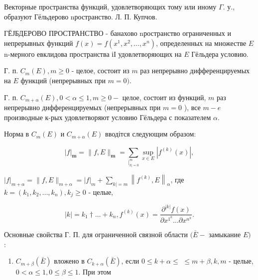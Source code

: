 \documentclass[10pt]{article}
\begin{document}
Векторные пространства функций, удовлетворяющих тому или иному $\Gamma$. у., образуют Гёльдерово nространство. Л. П. Купчов.



ГЁЈБДЕРОВО ПРОСТРАНСТВО - банахово nространство ограниченных и непрерывных функций $f(x)=f\left(x^{1}, x^{2}, \ldots, x^{n}\right)$, определенных на множестве $E$ n-мерного евклидова пространства іІ удовлетворяющих на $E$ Гёльдера условию.



Г. п. $C_{m}(E), m \geqslant 0$ - целое, состоит из $m$ раз непрерывно дифференцируемых на $E$ функций (непрерывных при $m=0)$.



Г. п. $C_{m+\alpha}(E), 0<\alpha \leqslant 1, m \geqslant 0-$ целое, состоит из функций, $m$ раз непрерывно дифференцируемых (непрерывных при $m=0$ ), все $m-e$ производные к-рых удовлетворяют условию Гёльдера с показателем $\alpha$.



Норма в $C_{m}(E)$ и $C_{m+\alpha}(E)$ вводітся следующим образом:



\[

|f|_{\boldsymbol{m}}=\|f, E\|_{\boldsymbol{m}}=\sum_{\left.\right|_{k \mid=0} ^{m}} \sup _{x \in E}\left|f^{(k)}(x)\right|,

\]



$|f|_{m+\alpha}=\|f, E\|_{m+\alpha}=|f|_{m}+\sum_{k \mid=m}\left\|f^{(k)}, E\right\|_{\alpha}$, где $k=\left(k_{1}, k_{2}, \ldots, k_{n}\right), k_{j} \geqslant 0$ - целые,



\[

|k|=k_{1} \dagger \ldots+k_{n}, f^{(k)}(x)=\frac{\partial^{|k|} f(x)}{\partial x^{1^{k}} \ldots \partial x^{n^{k}}} .

\]



Основные свойства Г. П. для ограниченной связной области $(\bar{E}-$ замыкание $E)$ :



\begin{enumerate}

  \item $C_{m+\beta}(\bar{E})$ вложено в $C_{k+\alpha}(\bar{E})$, если $0 \leqslant k+\alpha \leqslant$ $\leqslant m+\beta, k, m$ - целые, $0<\alpha \leqslant 1,0 \leqslant \beta \leqslant 1$. При этом

\end{enumerate}
\end{document}
